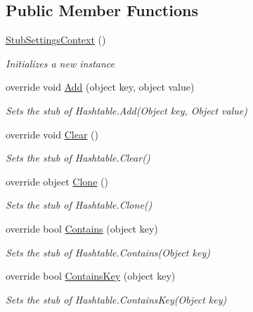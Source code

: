 \subsection*{Public Member Functions}
\begin{DoxyCompactItemize}
\item 
\hyperlink{class_system_1_1_configuration_1_1_fakes_1_1_stub_settings_context_add51406397cf048486e3313d023f57ab}{Stub\-Settings\-Context} ()
\begin{DoxyCompactList}\small\item\em Initializes a new instance\end{DoxyCompactList}\item 
override void \hyperlink{class_system_1_1_configuration_1_1_fakes_1_1_stub_settings_context_a2baf1b936c9e6d6a6379e786bd5d6278}{Add} (object key, object value)
\begin{DoxyCompactList}\small\item\em Sets the stub of Hashtable.\-Add(\-Object key, Object value)\end{DoxyCompactList}\item 
override void \hyperlink{class_system_1_1_configuration_1_1_fakes_1_1_stub_settings_context_a288c25be36a87f7f0265404784701b04}{Clear} ()
\begin{DoxyCompactList}\small\item\em Sets the stub of Hashtable.\-Clear()\end{DoxyCompactList}\item 
override object \hyperlink{class_system_1_1_configuration_1_1_fakes_1_1_stub_settings_context_ad45185f035077768cacbbc5ec662cdf0}{Clone} ()
\begin{DoxyCompactList}\small\item\em Sets the stub of Hashtable.\-Clone()\end{DoxyCompactList}\item 
override bool \hyperlink{class_system_1_1_configuration_1_1_fakes_1_1_stub_settings_context_a1e6fb193fca90d5182ac83e3d4e8cc0d}{Contains} (object key)
\begin{DoxyCompactList}\small\item\em Sets the stub of Hashtable.\-Contains(\-Object key)\end{DoxyCompactList}\item 
override bool \hyperlink{class_system_1_1_configuration_1_1_fakes_1_1_stub_settings_context_a8ad89e84ddf69d4100481d437f713b4e}{Contains\-Key} (object key)
\begin{DoxyCompactList}\small\item\em Sets the stub of Hashtable.\-Contains\-Key(\-Object key)\end{DoxyCompactList}\item 

\end{DoxyCompactItemize}
